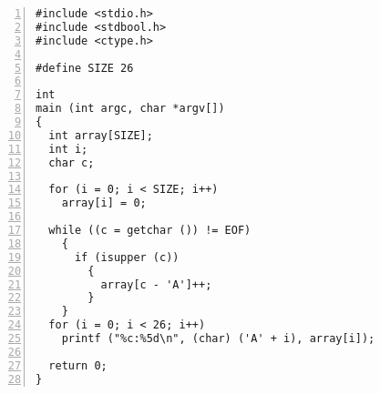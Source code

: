 \documentclass{article}
\begin{document}
\begin{lstlisting}[language={[ANSI]C},
        numbers=left,
        numberstyle=\tiny\menlo,
        basicstyle=\small\menlo]
#include <stdio.h>
#include <stdbool.h>
#include <ctype.h>

#define SIZE 26

int
main (int argc, char *argv[])
{
  int array[SIZE];
  int i;
  char c;

  for (i = 0; i < SIZE; i++)
    array[i] = 0;

  while ((c = getchar ()) != EOF)
    {
      if (isupper (c))
        {
          array[c - 'A']++;
        }
    }
  for (i = 0; i < 26; i++)
    printf ("%c:%5d\n", (char) ('A' + i), array[i]);

  return 0;
}
\end{lstlisting}
\end{document}
